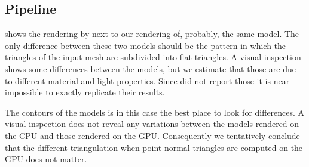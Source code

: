
\subsection{Pipeline}
\label{s:results:pipeline}
	 shows the rendering by \citeauthor{vlachos2001curved} next to our rendering of, probably, the same model. The only difference between these two models should be the pattern in which the triangles of the input mesh are subdivided into flat triangles. A visual inspection shows some differences between the models, but we estimate that those are due to different material and light properties. Since \citeauthor{vlachos2001curved} did not report those it is near impossible to exactly replicate their results. 

	The contours of the models is in this case the best place to look for differences. A visual inspection does not reveal any variations between the models rendered on the CPU and those rendered on the GPU. Consequently we tentatively conclude that the different triangulation when point-normal triangles are computed on the GPU does not matter.

	
